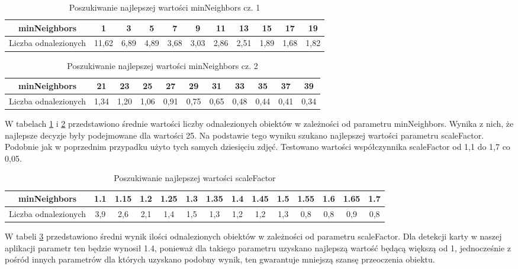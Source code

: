 \documentclass{article}
\numberwithin{equation}{section}
\begin{document}
\begin{table}[H]
    \caption{Poszukiwanie najlepszej wartości minNeighbors cz. 1}
    \label{tab:somsiadyNaj1}
    \begin{tabular}{|c|c|c|c|c|c|c|c|c|c|c|}
\hline
minNeighbors & 1 & 3 & 5 & 7 & 9 & 11 & 13 & 15 & 17 & 19\\
\hline
Liczba odnalezionych & 11,62 & 6,89 & 4,89 & 3,68 & 3,03 & 2,86 & 2,51 & 1,89 & 1,68 & 1,82 \\
\hline
\end{tabular}
\end{table}

\begin{table}[H]
    \caption{Poszukiwanie najlepszej wartości minNeighbors cz. 2}
    \label{tab:somsiadyNaj2}
    \begin{tabular}{|c|c|c|c|c|c|c|c|c|c|c|}
\hline
minNeighbors & 21 & 23 & 25 & 27 & 29 & 31 & 33 & 35 & 37 & 39\\
\hline
Liczba odnalezionych &  1,34 & 1,20 & 1,06 & 0,91 & 0,75 & 0,65 & 0,48 & 0,44 & 0,41 & 0,34\\
\hline
\end{tabular}
\end{table}

W tabelach \ref{tab:somsiadyNaj1} i \ref{tab:somsiadyNaj2} przedstawiono średnie wartości liczby odnalezionych obiektów w zależności od parametru minNeighbors. Wynika z nich, że najlepsze decyzje były podejmowane dla wartości 25.
Na podstawie tego wyniku szukano najlepszej wartości parametru scaleFactor. Podobnie jak w poprzednim przypadku użyto tych samych dziesięciu zdjęć. Testowano wartości współczynnika scaleFactor od 1,1 do 1,7 co 0,05.

\begin{table}[H]
    \caption{Poszukiwanie najlepszej wartości scaleFactor}
    \label{tab:ckalaNaj}
    \begin{tabular}{|c|c|c|c|c|c|c|c|c|c|c|c|c|c|}
\hline
minNeighbors & 1.1 & 1.15 & 1.2 & 1.25 & 1.3 & 1.35 & 1.4 & 1.45 & 1.5 & 1.55 & 1.6 & 1.65 & 1.7\\
\hline
Liczba odnalezionych & 3,9 & 2,6 & 2,1 & 1,4 & 1,5 & 1,3 & 1,2 & 1,2 & 1,3 & 0,8 & 0,8 & 0,9& 0,8\\
\hline
\end{tabular}
\end{table}

W tabeli \ref{tab:ckalaNaj} przedstawiono średni wynik ilości odnalezionych obiektów w zależności od parametru scaleFactor. Dla detekcji karty w naszej aplikacji parametr ten będzie wynosił 1.4, ponieważ dla takiego parametru uzyskano najlepszą wartość będącą większą od 1, jednocześnie z pośród innych parametrów dla których uzyskano podobny wynik, ten gwarantuje mniejszą szansę przeoczenia obiektu.
\end{document}
